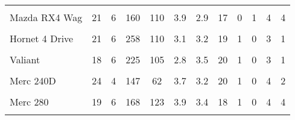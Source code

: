\documentclass[
  12pt,
]{article}
\begin{document}
\begin{longtable}[t]{lccccccccccc}
\endfoot
\bottomrule
\endlastfoot
\cellcolor{gray!6}{Mazda RX4} & \cellcolor{gray!6}{21} & \cellcolor{gray!6}{6} & \cellcolor{gray!6}{160} & \cellcolor{gray!6}{110} & \cellcolor{gray!6}{3.9} & \cellcolor{gray!6}{2.6} & \cellcolor{gray!6}{16} & \cellcolor{gray!6}{0} & \cellcolor{gray!6}{1} & \cellcolor{gray!6}{4} & \cellcolor{gray!6}{4}\\
Mazda RX4 Wag & 21 & 6 & 160 & 110 & 3.9 & 2.9 & 17 & 0 & 1 & 4 & 4\\
\cellcolor{gray!6}{Datsun 710} & \cellcolor{gray!6}{23} & \cellcolor{gray!6}{4} & \cellcolor{gray!6}{108} & \cellcolor{gray!6}{93} & \cellcolor{gray!6}{3.8} & \cellcolor{gray!6}{2.3} & \cellcolor{gray!6}{19} & \cellcolor{gray!6}{1} & \cellcolor{gray!6}{1} & \cellcolor{gray!6}{4} & \cellcolor{gray!6}{1}\\
Hornet 4 Drive & 21 & 6 & 258 & 110 & 3.1 & 3.2 & 19 & 1 & 0 & 3 & 1\\
\cellcolor{gray!6}{Hornet Sportabout} & \cellcolor{gray!6}{19} & \cellcolor{gray!6}{8} & \cellcolor{gray!6}{360} & \cellcolor{gray!6}{175} & \cellcolor{gray!6}{3.1} & \cellcolor{gray!6}{3.4} & \cellcolor{gray!6}{17} & \cellcolor{gray!6}{0} & \cellcolor{gray!6}{0} & \cellcolor{gray!6}{3} & \cellcolor{gray!6}{2}\\
\addlinespace
Valiant & 18 & 6 & 225 & 105 & 2.8 & 3.5 & 20 & 1 & 0 & 3 & 1\\
\cellcolor{gray!6}{Duster 360} & \cellcolor{gray!6}{14} & \cellcolor{gray!6}{8} & \cellcolor{gray!6}{360} & \cellcolor{gray!6}{245} & \cellcolor{gray!6}{3.2} & \cellcolor{gray!6}{3.6} & \cellcolor{gray!6}{16} & \cellcolor{gray!6}{0} & \cellcolor{gray!6}{0} & \cellcolor{gray!6}{3} & \cellcolor{gray!6}{4}\\
Merc 240D & 24 & 4 & 147 & 62 & 3.7 & 3.2 & 20 & 1 & 0 & 4 & 2\\
\cellcolor{gray!6}{Merc 230} & \cellcolor{gray!6}{23} & \cellcolor{gray!6}{4} & \cellcolor{gray!6}{141} & \cellcolor{gray!6}{95} & \cellcolor{gray!6}{3.9} & \cellcolor{gray!6}{3.1} & \cellcolor{gray!6}{23} & \cellcolor{gray!6}{1} & \cellcolor{gray!6}{0} & \cellcolor{gray!6}{4} & \cellcolor{gray!6}{2}\\
Merc 280 & 19 & 6 & 168 & 123 & 3.9 & 3.4 & 18 & 1 & 0 & 4 & 4\\
\addlinespace
\cellcolor{gray!6}{Merc 280C} & \cellcolor{gray!6}{18} & \cellcolor{gray!6}{6} & \cellcolor{gray!6}{168} & \cellcolor{gray!6}{123} & \cellcolor{gray!6}{3.9} & \cellcolor{gray!6}{3.4} & \cellcolor{gray!6}{19} & \cellcolor{gray!6}{1} & \cellcolor{gray!6}{0} & \cellcolor{gray!6}{4} & \cellcolor{gray!6}{4}\\

\end{longtable}
\end{document}
